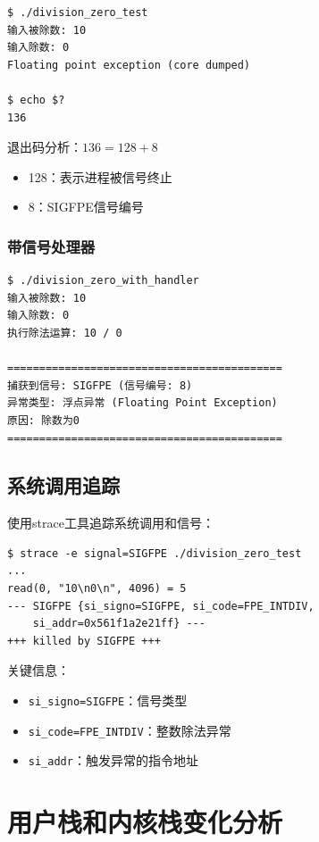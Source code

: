 \documentclass[UTF8,a4paper,12pt]{ctexart}
\begin{document}
\begin{lstlisting}[style=bashstyle,caption={无信号处理的运行结果}]
$ ./division_zero_test
输入被除数: 10
输入除数: 0
Floating point exception (core dumped)

$ echo $?
136
\end{lstlisting}

退出码分析：$136 = 128 + 8$
\begin{itemize}
    \item 128：表示进程被信号终止
    \item 8：SIGFPE信号编号
\end{itemize}

\subsubsection{带信号处理器}

\begin{lstlisting}[style=bashstyle,caption={带信号处理的运行结果}]
$ ./division_zero_with_handler
输入被除数: 10
输入除数: 0
执行除法运算: 10 / 0

===========================================
捕获到信号: SIGFPE (信号编号: 8)
异常类型: 浮点异常 (Floating Point Exception)
原因: 除数为0
===========================================
\end{lstlisting}

\subsection{系统调用追踪}

使用strace工具追踪系统调用和信号：

\begin{lstlisting}[style=bashstyle,caption={strace追踪结果}]
$ strace -e signal=SIGFPE ./division_zero_test
...
read(0, "10\n0\n", 4096) = 5
--- SIGFPE {si_signo=SIGFPE, si_code=FPE_INTDIV,
    si_addr=0x561f1a2e21ff} ---
+++ killed by SIGFPE +++
\end{lstlisting}

关键信息：
\begin{itemize}
    \item \texttt{si\_signo=SIGFPE}：信号类型
    \item \texttt{si\_code=FPE\_INTDIV}：整数除法异常
    \item \texttt{si\_addr}：触发异常的指令地址
\end{itemize}

\newpage

\section{用户栈和内核栈变化分析}
\end{document}
